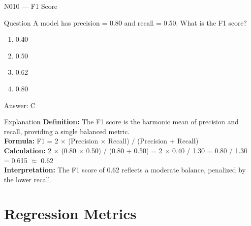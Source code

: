 \documentclass[aspectratio=169,8pt]{beamer}
\begin{document}
	\begin{frame}{N010 --- F1 Score}
		\begin{block}{Question}
			A model has precision = 0.80 and recall = 0.50. What is the F1 score?
			\begin{enumerate}
				\item 0.40
				\item 0.50
				\item 0.62
				\item 0.80
			\end{enumerate}
		\end{block}
		\begin{exampleblock}{Answer: C}\end{exampleblock}
		\begin{block}{Explanation}
			\textbf{Definition:} The F1 score is the harmonic mean of precision and recall, providing a single balanced metric.\\
			\textbf{Formula:} F1 = 2 $\times$ (Precision $\times$ Recall) / (Precision + Recall)\\
			\textbf{Calculation:} 2 $\times$ (0.80 $\times$ 0.50) / (0.80 + 0.50) = 2 $\times$ 0.40 / 1.30 = 0.80 / 1.30 = 0.615 $\approx$ 0.62\\
			\textbf{Interpretation:} The F1 score of 0.62 reflects a moderate balance, penalized by the lower recall.
		\end{block}
	\end{frame}
	
	\section{Regression Metrics}
	
\end{document}
